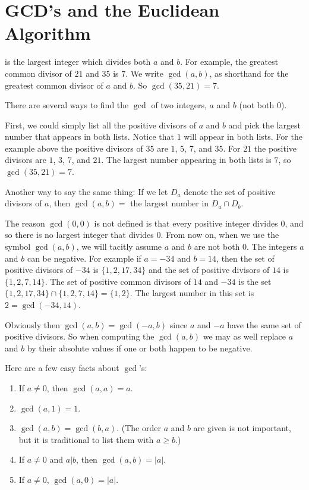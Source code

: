 \chapter{GCD's and the Euclidean Algorithm}


 is the largest
integer which divides both $a$ and $b$. For example, the greatest common divisor
of $21$ and $35$ is $7$.
We write $\gcd(a,b)$, as shorthand for the greatest common divisor of $a$ and $b$. So 
$\gcd(35,21) = 7$. 

There are several ways to find the $\gcd$ of two integers, $a$ and $b$ (not both $0$).

First, we could simply list all the positive divisors of $a$ and $b$ and pick the largest
number that appears in both lists. Notice that $1$ will appear in both lists.
For the example above the positive divisors of $35$ are $1$, $5$, $7$, and $35$. For $21$
the positive divisors are $1$, $3$, $7$, and $21$. The largest number appearing in both lists
is $7$, so $\gcd(35,21) = 7$. 

Another way to say the same thing: If we let $D_a$ denote the set of positive divisors
of $a$, then $\gcd(a,b) = $ the largest number in $D_a\cap D_b$.

The reason $\gcd(0,0)$ is not defined is that every positive integer divides $0$, and so there
is no largest integer that divides $0$. From now on, when we use the symbol $\gcd(a,b)$,
we will tacitly assume $a$ and $b$ are not both $0$. The integers $a$ and $b$ can be
negative.
For example if $a=-34$ and $b=14$, then the set of positive divisors of $-34$
is $\{1,2,17,34\}$ and the set of positive divisors of $14$ is $\{1,2,7,14\}$. The set of positive common divisors
of $14$ and $-34$ is the set $\{1,2,17,34\}\cap \{1,2,7,14\}=\{1,2\}$. The largest number in this
 set is $2=\gcd(-34,14)$.

Obviously then $\gcd(a,b)=\gcd(-a,b)$ since $a$ and $-a$ have the same set of positive divisors.
So when computing the $\gcd(a,b)$ we may as well replace $a$ and $b$ by their absolute values
if one or both happen to be negative.

Here are a few easy facts about $\gcd$'s: 
\begin{enumerate}
 \item If $a\not = 0$, then  $\gcd(a,a) = a$.
 
 \item  $\gcd(a,1) = 1$.
 
 \item  $\gcd(a,b) = \gcd(b,a)$. 
 (The order $a$ and $b$ are given is not important,\\
 but it is traditional to list them with $a\geq b$.)
 
 \item If $a\not = 0$ and $a|b$, then $\gcd(a,b)=|a|$. 
 
 \item If $a\neq 0$, $\gcd(a,0)=|a|$.
\end{enumerate}


